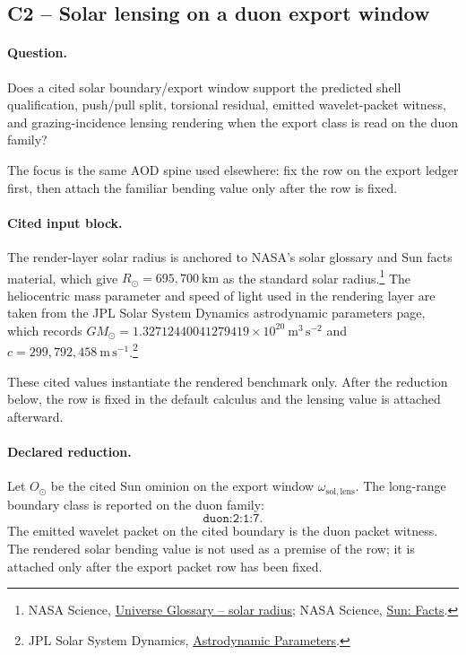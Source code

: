 \subsection{C2 -- Solar lensing on a duon export window}\label{app:c2}
\paragraph{Question.} Does a cited solar boundary/export window support the predicted shell qualification, push/pull split, torsional residual, emitted wavelet-packet witness, and grazing-incidence lensing rendering when the export class is read on the duon family?

The focus is the same AOD spine used elsewhere: fix the row on the export ledger first, then attach the familiar bending value only after the row is fixed.

\paragraph{Cited input block.} The render-layer solar radius is anchored to NASA's solar glossary and Sun facts material, which give $R_\odot = 695{,}700\ \mathrm{km}$ as the standard solar radius.\footnote{NASA Science, \href{https://science.nasa.gov/universe/glossary/}{Universe Glossary -- solar radius}; NASA Science, \href{https://science.nasa.gov/sun/facts/}{Sun: Facts}.} The heliocentric mass parameter and speed of light used in the rendering layer are taken from the JPL Solar System Dynamics astrodynamic parameters page, which records $GM_\odot = 1.32712440041279419\times 10^{20}\ \mathrm{m^3\,s^{-2}}$ and $c=299{,}792{,}458\ \mathrm{m\,s^{-1}}$.\footnote{JPL Solar System Dynamics, \href{https://ssd.jpl.nasa.gov/astro_par.html}{Astrodynamic Parameters}.}

These cited values instantiate the rendered benchmark only. After the reduction below, the row is fixed in the default calculus and the lensing value is attached afterward.

\paragraph{Declared reduction.} Let $O_\odot$ be the cited Sun ominion on the export window $\omega_{\mathrm{sol,lens}}$. The long-range boundary class is reported on the duon family:
\[
\texttt{duon:2:1:7}.
\]
The emitted wavelet packet on the cited boundary is the duon packet witness. The rendered solar bending value is not used as a premise of the row; it is attached only after the export packet row has been fixed.


